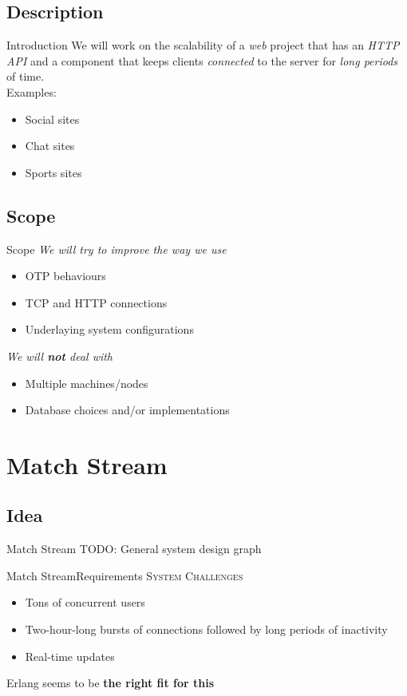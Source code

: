 \documentclass[utf8]{beamer}
\begin{document}
\subsection{Description}
\begin{frame}{Introduction}
	We will work on the scalability of a \emph{web} project \pause that has an \emph{HTTP API} \pause and a component that keeps clients \emph{connected} to the server \pause for \emph{long periods} of time.\\
\pause Examples:
	\begin{itemize}
		\item<+-> Social sites
		\item<+-> Chat sites
		\item<+-> Sports sites
	\end{itemize}
\end{frame}

\subsection{Scope}
\begin{frame}{Scope}
	\emph{We will try to improve the way we use}
	\begin{itemize}
		\item OTP behaviours
		\item TCP and HTTP connections
		\item Underlaying system configurations
	\end{itemize}
	\pause
	\emph{We will \textbf{not} deal with}
	\begin{itemize}
		\item Multiple machines/nodes
		\item Database choices and/or implementations
	\end{itemize}
\end{frame}

\section{Match Stream}
\subsection{Idea}
\begin{frame}{Match Stream}
	TODO: General system design graph
\end{frame}
\begin{frame}{Match Stream}{Requirements}
	\textsc{System Challenges}
	\begin{itemize}
		\item<+-> Tons of concurrent users
		\item<+-> Two-hour-long bursts of connections followed by long periods of inactivity
		\item<+-> Real-time updates
	\end{itemize}
	\onslide<+->Erlang seems to be \textbf{the right fit for this}
\end{frame}
\end{document}
